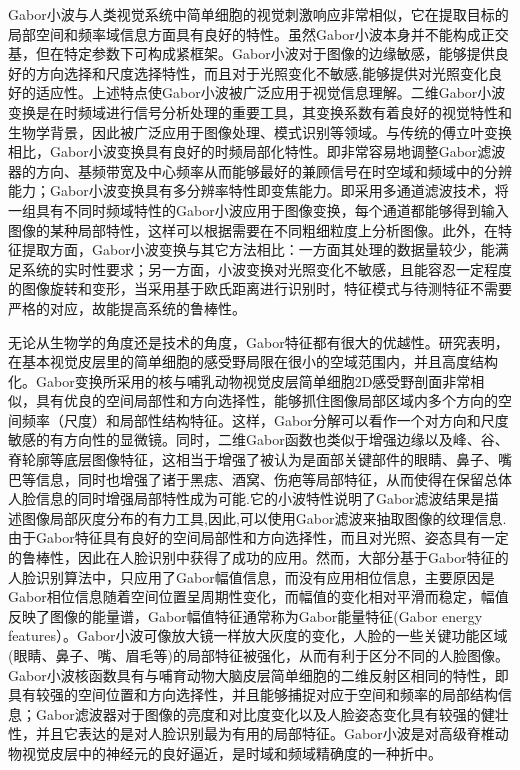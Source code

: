 Gabor小波与人类视觉系统中简单细胞的视觉刺激响应非常相似，它在提取目标的局部空间和频率域信息方面具有良好的特性\citep{Daugman1988,Kyrki2004Simple}。虽然Gabor小波本身并不能构成正交基，但在特定参数下可构成紧框架。Gabor小波对于图像的边缘敏感，能够提供良好的方向选择和尺度选择特性，而且对于光照变化不敏感,能够提供对光照变化良好的适应性。上述特点使Gabor小波被广泛应用于视觉信息理解。二维Gabor小波变换是在时频域进行信号分析处理的重要工具，其变换系数有着良好的视觉特性和生物学背景，因此被广泛应用于图像处理、模式识别等领域。与传统的傅立叶变换相比，Gabor小波变换具有良好的时频局部化特性。即非常容易地调整Gabor滤波器的方向、基频带宽及中心频率从而能够最好的兼顾信号在时空域和频域中的分辨能力；Gabor小波变换具有多分辨率特性即变焦能力。即采用多通道滤波技术，将一组具有不同时频域特性的Gabor小波应用于图像变换，每个通道都能够得到输入图像的某种局部特性，这样可以根据需要在不同粗细粒度上分析图像。此外，在特征提取方面，Gabor小波变换与其它方法相比：一方面其处理的数据量较少，能满足系统的实时性要求；另一方面，小波变换对光照变化不敏感，且能容忍一定程度的图像旋转和变形，当采用基于欧氏距离进行识别时，特征模式与待测特征不需要严格的对应，故能提高系统的鲁棒性。

无论从生物学的角度还是技术的角度，Gabor特征都有很大的优越性。研究表明，在基本视觉皮层里的简单细胞的感受野局限在很小的空域范围内，并且高度结构化。Gabor变换所采用的核与哺乳动物视觉皮层简单细胞2D感受野剖面非常相似，具有优良的空间局部性和方向选择性，能够抓住图像局部区域内多个方向的空间频率（尺度）和局部性结构特征。这样，Gabor分解可以看作一个对方向和尺度敏感的有方向性的显微镜。同时，二维Gabor函数也类似于增强边缘以及峰、谷、脊轮廓等底层图像特征，这相当于增强了被认为是面部关键部件的眼睛、鼻子、嘴巴等信息，同时也增强了诸于黑痣、酒窝、伤疤等局部特征，从而使得在保留总体人脸信息的同时增强局部特性成为可能.它的小波特性说明了Gabor滤波结果是描述图像局部灰度分布的有力工具,因此,可以使用Gabor滤波来抽取图像的纹理信息. 由于Gabor特征具有良好的空间局部性和方向选择性，而且对光照、姿态具有一定的鲁棒性，因此在人脸识别中获得了成功的应用。然而，大部分基于Gabor特征的人脸识别算法中，只应用了Gabor幅值信息，而没有应用相位信息，主要原因是Gabor相位信息随着空间位置呈周期性变化，而幅值的变化相对平滑而稳定，幅值反映了图像的能量谱，Gabor幅值特征通常称为Gabor能量特征(Gabor energy features）。Gabor小波可像放大镜一样放大灰度的变化，人脸的一些关键功能区域(眼睛、鼻子、嘴、眉毛等)的局部特征被强化，从而有利于区分不同的人脸图像。Gabor小波核函数具有与哺育动物大脑皮层简单细胞的二维反射区相同的特性，即具有较强的空间位置和方向选择性，并且能够捕捉对应于空间和频率的局部结构信息；Gabor滤波器对于图像的亮度和对比度变化以及人脸姿态变化具有较强的健壮性，并且它表达的是对人脸识别最为有用的局部特征。Gabor小波是对高级脊椎动物视觉皮层中的神经元的良好逼近，是时域和频域精确度的一种折中。

